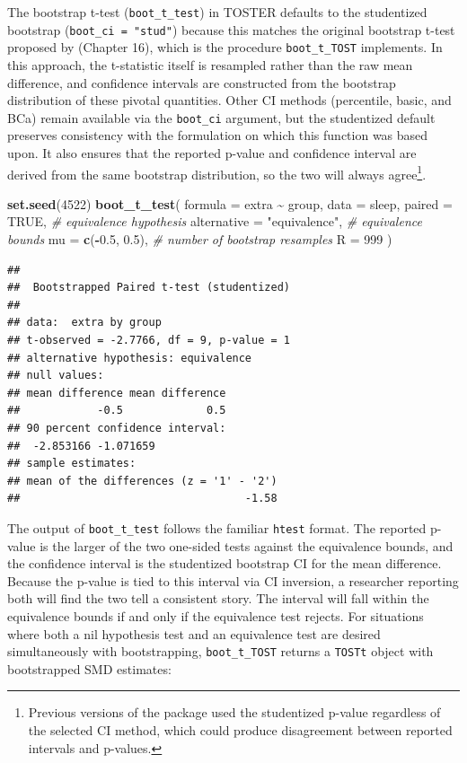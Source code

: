 \documentclass[]{interact}
\theoremstyle{plain}%
\theoremstyle{definition}
\theoremstyle{remark}
\newenvironment{Shaded}{\begin{snugshade}}{\end{snugshade}}
\newcommand{\AttributeTok}[1]{\textcolor[rgb]{0.13,0.29,0.53}{#1}}
\newcommand{\CommentTok}[1]{\textcolor[rgb]{0.56,0.35,0.01}{\textit{#1}}}
\newcommand{\ConstantTok}[1]{\textcolor[rgb]{0.56,0.35,0.01}{#1}}
\newcommand{\DecValTok}[1]{\textcolor[rgb]{0.00,0.00,0.81}{#1}}
\newcommand{\FloatTok}[1]{\textcolor[rgb]{0.00,0.00,0.81}{#1}}
\newcommand{\FunctionTok}[1]{\textcolor[rgb]{0.13,0.29,0.53}{\textbf{#1}}}
\newcommand{\NormalTok}[1]{#1}
\newcommand{\SpecialCharTok}[1]{\textcolor[rgb]{0.81,0.36,0.00}{\textbf{#1}}}
\newcommand{\StringTok}[1]{\textcolor[rgb]{0.31,0.60,0.02}{#1}}
\begin{document}
The bootstrap t-test (\texttt{boot\_t\_test}) in TOSTER defaults to the
studentized bootstrap (\texttt{boot\_ci\ =\ "stud"}) because this
matches the original bootstrap t-test proposed by \citet{efron93}
(Chapter 16), which is the procedure \texttt{boot\_t\_TOST} implements.
In this approach, the t-statistic itself is resampled rather than the
raw mean difference, and confidence intervals are constructed from the
bootstrap distribution of these pivotal quantities. Other CI methods
(percentile, basic, and BCa) remain available via the \texttt{boot\_ci}
argument, but the studentized default preserves consistency with the
\citet{efron93} formulation on which this function was based upon. It
also ensures that the reported p-value and confidence interval are
derived from the same bootstrap distribution, so the two will always
agree\footnote{Previous versions of the package used the studentized
  p-value regardless of the selected CI method, which could produce
  disagreement between reported intervals and p-values.}.

\begin{Shaded}
\begin{Highlighting}[]
\FunctionTok{set.seed}\NormalTok{(}\DecValTok{4522}\NormalTok{)}
\FunctionTok{boot\_t\_test}\NormalTok{(}
  \AttributeTok{formula =}\NormalTok{ extra }\SpecialCharTok{\textasciitilde{}}\NormalTok{ group,}
  \AttributeTok{data =}\NormalTok{ sleep,}
  \AttributeTok{paired =} \ConstantTok{TRUE}\NormalTok{,}
  \CommentTok{\# equivalence hypothesis}
  \AttributeTok{alternative =} \StringTok{"equivalence"}\NormalTok{,}
  \CommentTok{\# equivalence bounds}
  \AttributeTok{mu =} \FunctionTok{c}\NormalTok{(}\SpecialCharTok{{-}}\FloatTok{0.5}\NormalTok{, }\FloatTok{0.5}\NormalTok{),}
  \CommentTok{\# number of bootstrap resamples}
  \AttributeTok{R =} \DecValTok{999}
\NormalTok{)}
\end{Highlighting}
\end{Shaded}

\begin{verbatim}
## 
##  Bootstrapped Paired t-test (studentized)
## 
## data:  extra by group
## t-observed = -2.7766, df = 9, p-value = 1
## alternative hypothesis: equivalence
## null values:
## mean difference mean difference 
##            -0.5             0.5 
## 90 percent confidence interval:
##  -2.853166 -1.071659
## sample estimates:
## mean of the differences (z = '1' - '2') 
##                                   -1.58
\end{verbatim}

The output of \texttt{boot\_t\_test} follows the familiar \texttt{htest}
format. The reported p-value is the larger of the two one-sided tests
against the equivalence bounds, and the confidence interval is the
studentized bootstrap CI for the mean difference. Because the p-value is
tied to this interval via CI inversion, a researcher reporting both will
find the two tell a consistent story. The interval will fall within the
equivalence bounds if and only if the equivalence test rejects. For
situations where both a nil hypothesis test and an equivalence test are
desired simultaneously with bootstrapping, \texttt{boot\_t\_TOST}
returns a \texttt{TOSTt} object with bootstrapped SMD estimates:
\end{document}
